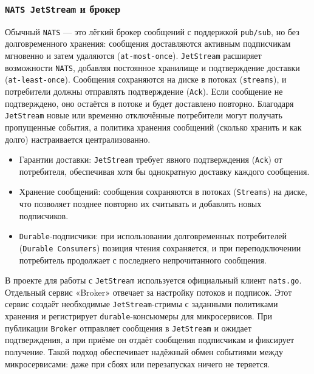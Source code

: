 \subsubsection*{\texttt{NATS JetStream} и брокер}
Обычный \texttt{NATS} — это лёгкий брокер сообщений с поддержкой \texttt{pub/sub}, но без долговременного хранения: сообщения доставляются активным подписчикам мгновенно и затем удаляются (\texttt{at-most-once}). \texttt{JetStream} расширяет возможности \texttt{NATS}, добавляя постоянное хранилище и подтверждение доставки (\texttt{at-least-once}). Сообщения сохраняются на диске в потоках (\texttt{streams}), и потребители должны отправлять подтверждение (\texttt{Ack}). Если сообщение не подтверждено, оно остаётся в потоке и будет доставлено повторно. Благодаря \texttt{JetStream} новые или временно отключённые потребители могут получать пропущенные события, а политика хранения сообщений (сколько хранить и как долго) настраивается централизованно.
\begin{itemize}
    \item Гарантии доставки: \texttt{JetStream} требует явного подтверждения (\texttt{Ack}) от потребителя, обеспечивая хотя бы однократную доставку каждого сообщения.
    \item Хранение сообщений: сообщения сохраняются в потоках (\texttt{Streams}) на диске, что позволяет позднее повторно их считывать и добавлять новых подписчиков.
    \item \texttt{Durable}-подписчики: при использовании долговременных потребителей (\texttt{Durable Consumers}) позиция чтения сохраняется, и при переподключении потребитель продолжает с последнего непрочитанного сообщения.
\end{itemize}
В проекте для работы с \texttt{JetStream} используется официальный клиент \texttt{nats.go}. Отдельный сервис «Broker» отвечает за настройку потоков и подписок. Этот сервис создаёт необходимые \texttt{JetStream}-стримы с заданными политиками хранения и регистрирует \texttt{durable}-консьюмеры для микросервисов. При публикации \texttt{Broker} отправляет сообщения в \texttt{JetStream} и ожидает подтверждения, а при приёме он отдаёт сообщения подписчикам и фиксирует получение. Такой подход обеспечивает надёжный обмен событиями между микросервисами: даже при сбоях или перезапусках ничего не теряется.

